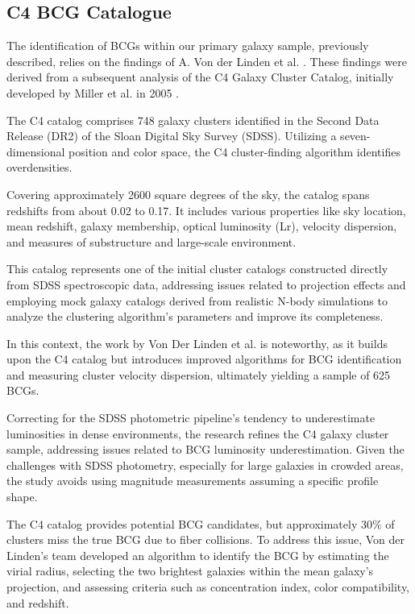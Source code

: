\subsection{C4 BCG Catalogue}
The identification of BCGs within our primary galaxy sample, previously described, relies on the findings of A. Von der Linden et al. \cite{2007MNRAS.379..867V, 2009yCat..73790867V}. These findings were derived from a subsequent analysis of the C4 Galaxy Cluster Catalog, initially developed by Miller et al. in 2005 \cite{2005AJ....130..968M}.

The C4 catalog comprises 748 galaxy clusters identified in the Second Data Release (DR2) of the Sloan Digital Sky Survey (SDSS). Utilizing a seven-dimensional position and color space, the C4 cluster-finding algorithm identifies overdensities. 

Covering approximately 2600 square degrees of the sky, the catalog spans redshifts from about 0.02 to 0.17. It includes various properties like sky location, mean redshift, galaxy membership, optical luminosity (Lr), velocity dispersion, and measures of substructure and large-scale environment.

This catalog represents one of the initial cluster catalogs constructed directly from SDSS spectroscopic data, addressing issues related to projection effects and employing mock galaxy catalogs derived from realistic N-body simulations to analyze the clustering algorithm's parameters and improve its completeness.

In this context, the work by Von Der Linden et al.  \cite{2007MNRAS.379..867V} is noteworthy, as it builds upon the C4 catalog but introduces improved algorithms for BCG identification and measuring cluster velocity dispersion,  ultimately yielding a sample of 625 BCGs.

Correcting for the SDSS photometric pipeline's tendency to underestimate luminosities in dense environments, the research refines the C4 galaxy cluster sample, addressing issues related to BCG luminosity underestimation. Given the challenges with SDSS photometry, especially for large galaxies in crowded areas, the study avoids using magnitude measurements assuming a specific profile shape.

The C4 catalog provides potential BCG candidates, but approximately $30\% $ of clusters miss the true BCG due to fiber collisions. To address this issue,  Von der Linden's team developed an algorithm to identify the BCG by estimating the virial radius, selecting the two brightest galaxies within the mean galaxy's projection, and assessing criteria such as concentration index, color compatibility, and redshift.

